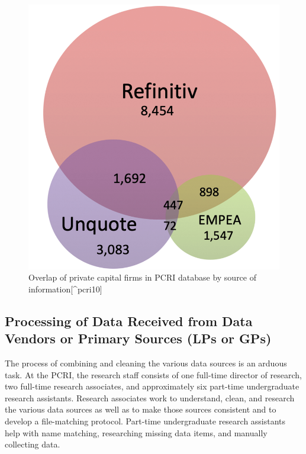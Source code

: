 \documentclass[
]{book}
\begin{document}
\begin{figure}
\includegraphics[width=1\linewidth]{./assets/pcri/pcrifigure1web} \caption{Overlap of private capital firms in PCRI database by source of information[^pcri10]}\label{fig:pcrifigure1}
\end{figure}

\hypertarget{processing-of-data-received-from-data-vendors-or-primary-sources-lps-or-gps}{%
\subsection{Processing of Data Received from Data Vendors or Primary Sources (LPs or GPs)}\label{processing-of-data-received-from-data-vendors-or-primary-sources-lps-or-gps}}

The process of combining and cleaning the various data sources is an arduous task. At the PCRI, the research staff consists of one full-time director of research, two full-time research associates, and approximately six part-time undergraduate research assistants. Research associates work to understand, clean, and research the various data sources as well as to make those sources consistent and to develop a file-matching protocol. Part-time undergraduate research assistants help with name matching, researching missing data items, and manually collecting data.
\end{document}
